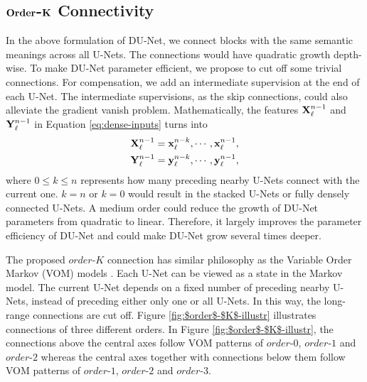 
\subsection{${\bf Order}$-${\bf K}$ Connectivity}
In the above formulation of DU-Net, we connect blocks with the same semantic meanings across all U-Nets. The connections would have quadratic growth depth-wise. To make DU-Net parameter efficient, we propose to cut off some trivial connections. For compensation, we add an intermediate supervision at the end of each U-Net. The intermediate supervisions, as the skip connections, could also alleviate the gradient vanish problem. Mathematically, the features  ${\bf X}_\ell^{n-1}$ and ${\bf Y}_\ell^{n-1}$ in Equation \ref{eq:dense-inputs} turns into 
\begin{gather}
    {\bf X}_{\ell}^{n-1}={\bf x}_{\ell}^{n-k},\cdots,{\bf x}_{\ell}^{n-1},\\
    {\bf Y}_{\ell}^{n-1}={\bf y}_{\ell}^{n-k},\cdots,{\bf y}_{\ell}^{n-1},
\end{gather}
where $0\leq k\leq n$ represents how many preceding nearby U-Nets connect with the current one. $k=n$ or $k=0$ would result in the stacked U-Nets or fully densely connected U-Nets. A medium order could reduce the growth of DU-Net parameters from quadratic to linear. Therefore, it largely improves the parameter efficiency of DU-Net and could make DU-Net grow several times deeper.

The proposed $order$-$K$ connection has similar philosophy as the Variable Order Markov (VOM) models \cite{begleiter2004prediction}. Each U-Net can be viewed as a state in the Markov model. The current U-Net depends on a fixed number of preceding nearby U-Nets, instead of preceding either only one or all U-Nets. In this way, the long-range connections are cut off. Figure \ref{fig:$order$-$K$-illustr} illustrates connections of three different orders. In Figure \ref{fig:$order$-$K$-illustr}, the connections above the central axes follow VOM patterns of $order$-$0$, $order$-$1$ and $order$-$2$ whereas the central axes together with connections below them follow VOM patterns of $order$-$1$, $order$-$2$ and $order$-$3$.

